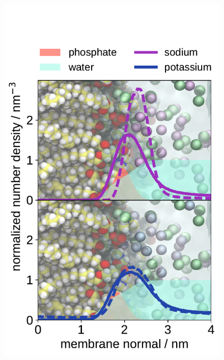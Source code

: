 \documentclass[journal=jpcbfk,manuscript=article]{achemso}
\newlength{\figheight}
\begin{document}

\begin{figure}[tbp!] 
  \centering 
  \includegraphics[height=\figheight]{../img/ecc_pops/density_profiles_na-k-counterions_wat_phos_compar_purePOPS_ecclipids-lipid17.pdf}

\end{figure}
\end{document}
